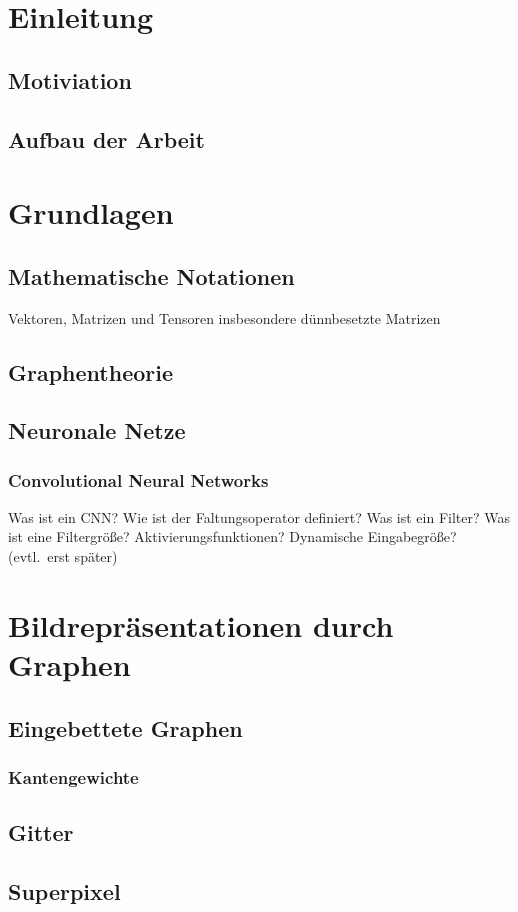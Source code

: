 \chapter{Einleitung}
\section{Motiviation}
\section{Aufbau der Arbeit}

\chapter{Grundlagen}
\section{Mathematische Notationen}
Vektoren, Matrizen und Tensoren
insbesondere dünnbesetzte Matrizen
\section{Graphentheorie}
\section{Neuronale Netze}
\subsection{Convolutional Neural Networks}
Was ist ein CNN\@?
Wie ist der Faltungsoperator definiert?
Was ist ein Filter?
Was ist eine Filtergröße?
Aktivierungsfunktionen?
Dynamische Eingabegröße? (evtl.\ erst später)

\chapter{Bildrepräsentationen durch Graphen}
\section{Eingebettete Graphen}
\subsection{Kantengewichte}
\section{Gitter}
\section{Superpixel}
